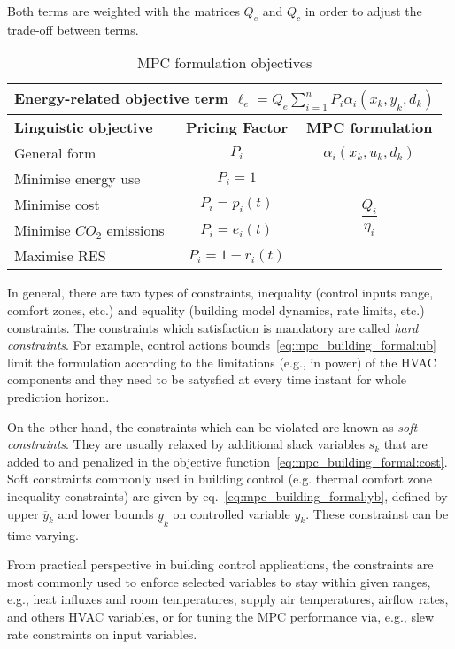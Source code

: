 \documentclass[10pt]{extarticle}
\begin{document}
Both terms are weighted with the matrices $Q_e$ and $Q_c$
in order to adjust the trade-off between terms.

\renewcommand{\arraystretch}{1.5}
\begin{table}[h]
	\centering
	\caption{MPC formulation objectives}
	\label{tab:mpc_form:objectives}
	\begin{tabular}{l|c|c}
		\toprule
		\multicolumn{3}{l}{\textbf{Energy-related objective term $\ell_e = Q_e \sum_{i=1}^{n} P_i \alpha_i(x_k, y_k, d_k)$}} \\
		\midrule
		\textbf{Linguistic objective} & \textbf{Pricing Factor} & \textbf{MPC formulation} \\
		\midrule
		General form & $P_i$ &  $\alpha_i(x_k, u_k, d_k)$ \\
		\midrule
		Minimise energy use & $P_i = 1$ & \multirow{4}{*}{ $\dfrac{Q_{i}}{\eta_i}$} \\
		Minimise cost & $P_i = p_i(t)$ &  \\
		Minimise $CO_2$ emissions & $P_i = e_i(t)$ & \\
		Maximise RES & $P_i = 1 - r_i(t)$ &   \\
		\bottomrule 
	\end{tabular}
\end{table}

In general, there are two types of constraints,
inequality  (control inputs range, comfort zones, etc.) and equality 
(building model dynamics, rate limits, etc.) constraints.
The constraints which satisfaction is mandatory are called 
\textit{hard constraints}. For example, control actions
bounds~\eqref{eq:mpc_building_formal:ub} limit the formulation
according to the limitations (e.g., in power) of the HVAC components
and they need to be satysfied at every time instant for whole prediction horizon.

On the other hand, the constraints which can be violated are
known as \textit{soft constraints}. They are usually relaxed
by additional slack variables $s_k$ that are added to and
penalized in the objective function~\eqref{eq:mpc_building_formal:cost}.
Soft constraints commonly used in building control (e.g. thermal comfort
zone inequality constraints) are given by eq.~\eqref{eq:mpc_building_formal:yb},
defined by upper $\overline{y}_k$  and lower bounds $\underline{y}_k$
on controlled variable $y_{k}$. These constrainst can be time-varying.

From practical perspective in building control applications,
the constraints are most commonly used to enforce selected
variables to stay within given ranges, e.g., heat influxes
and room temperatures, supply air temperatures, airflow rates,
and others HVAC variables, or for tuning the MPC performance via,
e.g., slew rate constraints on input variables.
\end{document}
